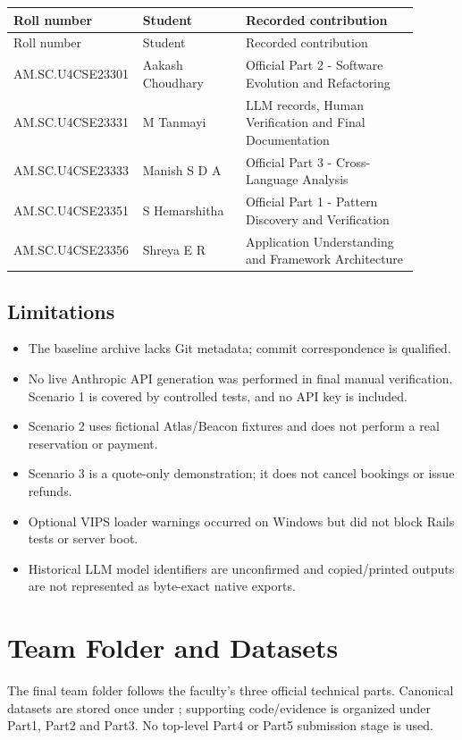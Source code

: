 \documentclass[11pt,a4paper]{article}
\renewcommand{\_}{\textunderscore\allowbreak}
\begin{document}
\begin{longtable}{p{0.23\linewidth}p{0.25\linewidth}p{0.42\linewidth}}
\toprule Roll number & Student & Recorded contribution\\\midrule\endfirsthead
\toprule Roll number & Student & Recorded contribution\\\midrule\endhead
AM.SC.U4CSE23301 & Aakash Choudhary & Official Part 2 - Software Evolution and Refactoring\\
AM.SC.U4CSE23331 & M Tanmayi & LLM records, Human Verification and Final Documentation\\
AM.SC.U4CSE23333 & Manish S D A & Official Part 3 - Cross-Language Analysis\\
AM.SC.U4CSE23351 & S Hemarshitha & Official Part 1 - Pattern Discovery and Verification\\
AM.SC.U4CSE23356 & Shreya E R & Application Understanding and Framework Architecture\\\bottomrule
\end{longtable}

\subsection{Limitations}
\begin{itemize}
\item The baseline archive lacks Git metadata; commit correspondence is qualified.
\item No live Anthropic API generation was performed in final manual verification. Scenario 1 is covered by controlled tests, and no API key is included.
\item Scenario 2 uses fictional Atlas/Beacon fixtures and does not perform a real reservation or payment.
\item Scenario 3 is a quote-only demonstration; it does not cancel bookings or issue refunds.
\item Optional VIPS loader warnings occurred on Windows but did not block Rails tests or server boot.
\item Historical LLM model identifiers are unconfirmed and copied/printed outputs are not represented as byte-exact native exports.
\end{itemize}

\section{Team Folder and Datasets}
The final team folder follows the faculty's three official technical parts. Canonical datasets are stored once under ; supporting code/evidence is organized under Part1, Part2 and Part3. No top-level Part4 or Part5 submission stage is used.
\end{document}
